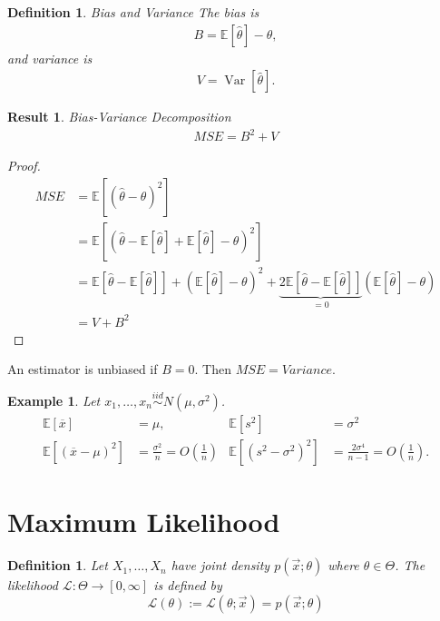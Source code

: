 \documentclass[10pt]{article}
\newtheorem{result}[theorem]{Result}
\newtheorem{definition}[def]{Definition}
\newtheorem{example}[ex]{Example}
\newcommand{\Expect}[1]{\mathbb{E}\!\left[#1\right]}
\DeclareMathOperator*{\Variance}{Var}
\newcommand{\Var}[1]{\Variance\!\left[#1\right]}
\renewcommand{\bar}{\overline}
\renewcommand{\hat}{\widehat}
\begin{document}
\begin{definition}{Bias and Variance}
The bias is
\begin{align}
B = \Expect{\hat\theta} - \theta,
\end{align}
and variance is
\begin{align}
V = \Var{\hat\theta }.
\end{align}
\end{definition}

\begin{result}{Bias-Variance Decomposition}
\begin{align}
\mathit{MSE} = B^2 + V
\end{align}
\end{result}
\begin{proof}
\begin{align*}
\mathit{MSE} &= \Expect{ ( \hat\theta - \theta )^2}\\
&= \Expect{ \left(\hat\theta - \Expect{\hat\theta} +
    \Expect{\hat\theta} - \theta\right)^2 }\\ 
&= \Expect{ \hat\theta - \Expect{\hat\theta} } + \left(
  \Expect{\hat\theta} - \theta \right)^2 +  
\underbrace{2\Expect{ \hat\theta - \Expect{\hat\theta} }}_{=0}
\left(\Expect{\hat\theta} - \theta \right)\\ 
&= V + B^2
\end{align*}
\end{proof}

An estimator is unbiased if $B=0$. Then $\mathit{MSE} = Variance$.

\begin{example}
Let $x_1, \ldots, x_n \overset{iid}\sim N(\mu,\sigma^2)$.
\begin{align*} \Expect{\bar{x}} &= \mu, & \Expect{s^2} &= \sigma^2\\
  \Expect{(\bar{x} - \mu)^2} &= \frac{\sigma^2}n
  =O\left(\frac1n\right) &
\Expect{(s^2 - \sigma^2)^2 } &= \frac{2\sigma^4}{n-1} =
O\left(\frac1n\right).
\end{align*}
\end{example}

\section{Maximum Likelihood}
\label{sec:max-likelihood}
\begin{definition}
  Let $X_1,\ldots,X_n$ have joint density $p(\vec{x};\theta)$ where
  $\theta\in\Theta$. The {\em likelihood}
  $\mathcal{L}:\Theta\rightarrow\left[0,\infty\right]$ is defined by
  \begin{equation}
    \mathcal{L}(\theta):=\mathcal{L}(\theta;\vec{x})=p(\vec{x};\theta)
  \end{equation}
\end{definition}
\end{document}
